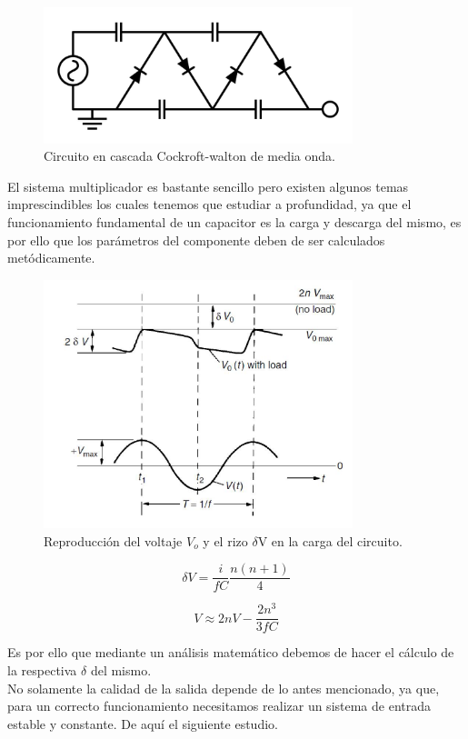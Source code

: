 \begin{figure}[H]
\centering
\includegraphics[width=9cm]{capitulo2/figs/circ.png}
\caption{ Circuito en cascada Cockroft-walton de media onda.}
\end{figure}
El sistema multiplicador es bastante sencillo pero existen algunos temas imprescindibles los cuales tenemos que estudiar a profundidad, ya que el funcionamiento fundamental de un capacitor es la carga y descarga del mismo, es por ello que los parámetros del componente deben de ser calculados metódicamente.

\begin{figure}[H]
\centering
\includegraphics[width=9cm]{capitulo2/figs/riso.png}
\caption{ Reproducción del voltaje $V_{o}$ y el rizo $\delta$V en la carga del circuito.}
\end{figure}

\begin{equation}
\delta V=\frac{i}{fC}\frac{n(n+1)}{4}
\end{equation}

\begin{equation}
V\approx 2nV-\frac{2n^{3}}{3fC}
\end{equation}

Es por ello que mediante un análisis matemático debemos de hacer el cálculo de la respectiva $\delta$ del mismo.\\
No solamente la calidad de la salida depende de lo antes mencionado, ya que, para un correcto funcionamiento necesitamos realizar un sistema de entrada estable y constante. De aquí el siguiente estudio.
\newpage
